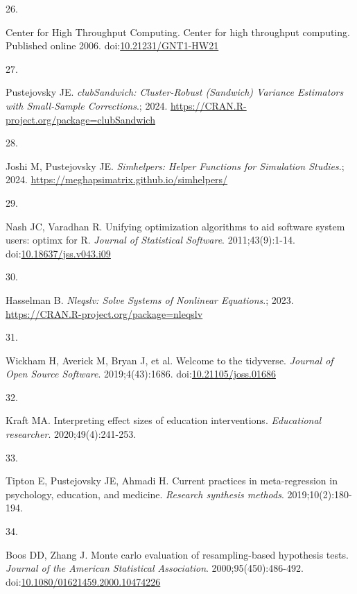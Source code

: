\documentclass[
  american,
  man, donotrepeattitle,floatsintext]{apa7}
\newlength{\cslhangindent}
\newlength{\csllabelwidth}
\newenvironment{CSLReferences}[2] %
 {\begin{list}{}{%
  \setlength{\itemindent}{0pt}
  \setlength{\leftmargin}{0pt}
  \setlength{\parsep}{0pt}
  \ifodd #1
   \setlength{\leftmargin}{\cslhangindent}
   \setlength{\itemindent}{-1\cslhangindent}
  \fi
  \setlength{\itemsep}{#2\baselineskip}}}
 {\end{list}}
\newcommand{\CSLLeftMargin}[1]{\parbox[t]{\csllabelwidth}{\strut#1\strut}}
\newcommand{\CSLRightInline}[1]{\parbox[t]{\linewidth - \csllabelwidth}{\strut#1\strut}}
\begin{document}
\begin{CSLReferences}{0}{1}
\CSLLeftMargin{26. }%
\CSLRightInline{Center for High Throughput Computing. Center for high throughput computing. Published online 2006. doi:\href{https://doi.org/10.21231/GNT1-HW21}{10.21231/GNT1-HW21}}

\CSLLeftMargin{27. }%
\CSLRightInline{Pustejovsky JE. \emph{clubSandwich: Cluster-Robust (Sandwich) Variance Estimators with Small-Sample Corrections}.; 2024. \url{https://CRAN.R-project.org/package=clubSandwich}}

\CSLLeftMargin{28. }%
\CSLRightInline{Joshi M, Pustejovsky JE. \emph{Simhelpers: Helper Functions for Simulation Studies}.; 2024. \url{https://meghapsimatrix.github.io/simhelpers/}}

\CSLLeftMargin{29. }%
\CSLRightInline{Nash JC, Varadhan R. Unifying optimization algorithms to aid software system users: {optimx} for {R}. \emph{Journal of Statistical Software}. 2011;43(9):1-14. doi:\href{https://doi.org/10.18637/jss.v043.i09}{10.18637/jss.v043.i09}}

\CSLLeftMargin{30. }%
\CSLRightInline{Hasselman B. \emph{Nleqslv: Solve Systems of Nonlinear Equations}.; 2023. \url{https://CRAN.R-project.org/package=nleqslv}}

\CSLLeftMargin{31. }%
\CSLRightInline{Wickham H, Averick M, Bryan J, et al. Welcome to the {tidyverse}. \emph{Journal of Open Source Software}. 2019;4(43):1686. doi:\href{https://doi.org/10.21105/joss.01686}{10.21105/joss.01686}}

\CSLLeftMargin{32. }%
\CSLRightInline{Kraft MA. Interpreting effect sizes of education interventions. \emph{Educational researcher}. 2020;49(4):241-253.}

\CSLLeftMargin{33. }%
\CSLRightInline{Tipton E, Pustejovsky JE, Ahmadi H. Current practices in meta-regression in psychology, education, and medicine. \emph{Research synthesis methods}. 2019;10(2):180-194.}

\CSLLeftMargin{34. }%
\CSLRightInline{Boos DD, Zhang J. Monte carlo evaluation of resampling-based hypothesis tests. \emph{Journal of the American Statistical Association}. 2000;95(450):486-492. doi:\href{https://doi.org/10.1080/01621459.2000.10474226}{10.1080/01621459.2000.10474226}}

\end{CSLReferences}

\endgroup
\end{document}
